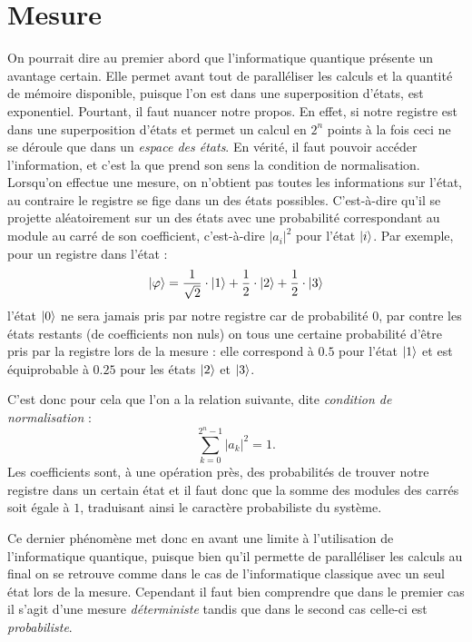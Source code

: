 \documentclass[a4paper,11pt]{tipe}
\newcommand{\abs}[1]{\left| #1 \right|}
\begin{document}
\section{Mesure}
On pourrait dire au premier abord que l'informatique quantique présente un
avantage certain. Elle permet avant tout de paralléliser les calculs et la
quantité de mémoire disponible, puisque l'on est dans une superposition
d'états, est exponentiel. Pourtant, il faut nuancer notre propos. En effet, si
notre registre est dans une superposition d'états et permet un calcul en $2^n$
points à la fois ceci ne se déroule que dans un \emph{espace des états}. En
vérité, il faut pouvoir accéder l'information, et c'est la que prend son sens
la condition de normalisation. Lorsqu'on effectue une mesure, on n'obtient pas
toutes les informations sur l'état, au contraire le registre se \og fige \fg{}
dans un des états possibles. C'est-à-dire qu'il se projette aléatoirement sur
un des états avec une probabilité correspondant au module au carré de son
coefficient, c'est-à-dire $\abs{a_i} ^ 2$ pour l'état $\ket i$. Par exemple,
pour un registre dans l'état :
\[ \ket\varphi = \frac 1 {\sqrt 2} \cdot \ket 1
  + \frac 1 2 \cdot \ket 2
  + \frac 1 2 \cdot \ket 3
\]
l'état $\ket 0$ ne sera jamais pris par notre registre car de probabilité $0$,
par contre les états restants (de coefficients non nuls) on tous une certaine
probabilité d'être pris par la registre lors de la mesure : elle correspond à
$0.5$ pour l'état $\ket 1$ et est équiprobable à $0.25$ pour les états $\ket 2$
et $\ket 3$.

C'est donc pour cela que l'on a la relation suivante, dite \emph{condition de
normalisation} :
\[ \sum_{k=0}^{2^n-1} \abs{a_k} ^2 = 1.\]
Les coefficients sont, à une opération près, des probabilités de trouver notre
registre dans un certain état et il faut donc que la somme des modules des
carrés soit égale à $1$, traduisant ainsi le caractère probabiliste du système.

Ce dernier phénomène met donc en avant une limite à l'utilisation de
l'informatique quantique, puisque bien qu'il permette de paralléliser les
calculs au final on se retrouve comme dans le cas de l'informatique classique
avec un seul état lors de la mesure. Cependant il faut bien comprendre que dans
le premier cas il s'agit d'une mesure \emph{déterministe} tandis que dans le
second cas celle-ci est \emph{probabiliste}.
\end{document}
